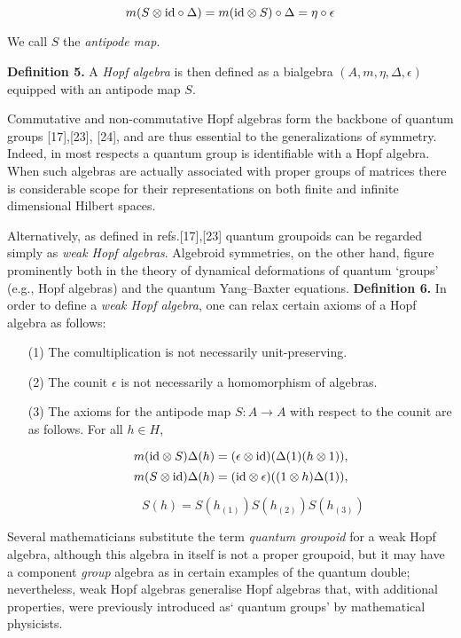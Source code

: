 \documentclass[12pt]{article}
\theoremstyle{plain}
\theoremstyle{definition}
\numberwithin{equation}{section}
\newcommand{\ID}{{\rm id}}
\begin{document}
\begin{equation}
m(S \otimes
\ID \circ \Delta)= m(\ID \otimes S) \circ \Delta = \eta \circ \epsilon
\end{equation}

We call $S$ the \emph{antipode map}.

\textbf{Definition 5.}
 A \emph{Hopf algebra} is then defined as a bialgebra $(A,m, \eta, \Delta, \epsilon)$ equipped with an antipode
map $S$.

Commutative and non-commutative Hopf algebras form the backbone of quantum groups [17],[23], [24], and are thus essential to the generalizations of symmetry. Indeed, in most respects a quantum group is identifiable with a Hopf algebra. When such algebras are actually associated with proper groups of matrices there is considerable scope for their representations on both finite and infinite dimensional Hilbert spaces.


Alternatively,  as defined in refs.[17],[23] quantum groupoids can be regarded simply as \emph{weak Hopf algebras}. Algebroid symmetries, on the other hand, figure prominently both in the theory of dynamical deformations of quantum `groups' (e.g., Hopf algebras) and the quantum Yang--Baxter equations.
\bigbreak
\textbf{Definition 6.} In order to define a \emph{weak Hopf algebra}, one can relax certain axioms of a Hopf algebra as follows:
\begin{itemize}\itemsep=0pt
\item[(1)] The comultiplication is not necessarily unit-preserving.
\item[(2)] The counit $\epsilon$ is not necessarily a homomorphism of algebras.
\item[(3)] The axioms for the antipode map $S : A \rightarrow A$ with respect to the
counit are as follows. For all $h \in H$,

\begin{equation} m(\ID \otimes S) \Delta (h)  = (\epsilon \otimes
\ID)(\Delta (1) (h \otimes 1)),\end{equation}
\begin{equation}
 m(S \otimes \ID) \Delta (h)  = (\ID \otimes \epsilon)((1 \otimes h) \Delta(1)),
\end{equation}

\begin{equation}
 \qquad S(h)  = S(h_{(1)})
S(h_{(2)})  S(h_{(3)}) \end{equation}
\end{itemize}

\bigbreak
Several mathematicians substitute the term \emph{quantum groupoid} for a weak Hopf algebra, although this algebra in
itself is not a proper groupoid, but it may have a component \emph{group} algebra as in certain examples of the quantum double; nevertheless, weak Hopf algebras generalise Hopf algebras  that, with additional properties, were previously introduced as` quantum groups'  by mathematical physicists.
\end{document}
